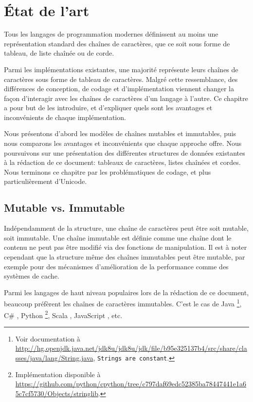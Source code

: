 \chapter{État de l'art}\label{state_art_chap}

Tous les langages de programmation modernes définissent au moins une
représentation standard des chaînes de caractères, que ce soit
sous forme de tableau, de liste chaînée ou de corde.

Parmi les implémentations existantes, une majorité représente leurs chaînes
de caractères sous forme de tableau de caractères.
Malgré cette ressemblance, des différences de conception,
de codage et d'implémentation viennent changer la façon
d'interagir avec les chaînes de caractères d'un langage à
l'autre.
Ce chapitre a pour but de les introduire, et d'expliquer quels
sont les avantages et inconvénients de chaque implémentation.

Nous présentons d'abord les modèles de chaînes mutables et immutables,
puis nous comparons les avantages et inconvénients que chaque approche
offre.
Nous poursuivons sur une présentation des différentes structures de
données existantes à la rédaction de ce document: tableaux de caractères,
listes chaînées et cordes.
Nous terminons ce chapitre par les problématiques de codage, et plus
particulièrement d'Unicode.

\section{Mutable vs. Immutable}

Indépendamment de la structure, une chaîne de caractères peut être soit mutable,
soit immutable.
Une chaîne immutable est définie comme une chaîne dont le contenu ne peut pas
être modifié via des fonctions de manipulation.
Il est à noter cependant que la structure même des chaînes immutables peut être
mutable, par exemple pour des mécanismes d'amélioration de la performance comme
des systèmes de cache.

Parmi les langages de haut niveau populaires lors de la rédaction de ce document,
beaucoup préfèrent les chaînes de caractères immutables.
C'est le cas de Java \cite{java_spec}\footnote{Voir documentation à
\url{http://hg.openjdk.java.net/jdk8u/jdk8u/jdk/file/b95e325137b4/src/share/classes/java/lang/String.java},
\texttt{Strings are constant}.}, C\# \cite{csharp_spec}, Python \cite{pythonref}\footnote{Implémentation
disponible à \url{https://github.com/python/cpython/tree/c797daf69edc52385ba78447441e1a65c7cf5730/Objects/stringlib}.},
Scala \cite{scalaspec}, JavaScript \cite{ecmascript_spec}, etc.

